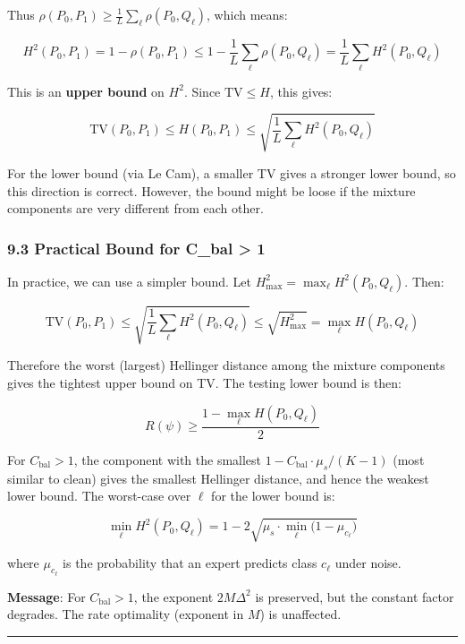 \documentclass[
  12pt,
]{article}
\begin{document}
Thus \(\rho(P_0, P_1) \geq \frac{1}{L}\sum_{\ell} \rho(P_0, Q_\ell)\),
which means:

\[H^2(P_0, P_1) = 1 - \rho(P_0, P_1) \leq 1 - \frac{1}{L}\sum_{\ell} \rho(P_0, Q_\ell)
= \frac{1}{L}\sum_{\ell} H^2(P_0, Q_\ell)\]

This is an \textbf{upper bound} on \(H^2\). Since \(\text{TV} \leq H\),
this gives:

\[\text{TV}(P_0, P_1) \leq H(P_0, P_1) \leq \sqrt{\frac{1}{L}\sum_{\ell} H^2(P_0, Q_\ell)}\]

For the lower bound (via Le Cam), a smaller TV gives a stronger lower
bound, so this direction is correct. However, the bound might be loose
if the mixture components are very different from each other.

\subsubsection{9.3 Practical Bound for C\_bal \textgreater{}
1}\label{practical-bound-for-c_bal-1}

In practice, we can use a simpler bound. Let
\(H^2_{\max} = \max_{\ell} H^2(P_0, Q_\ell)\). Then:

\[\text{TV}(P_0, P_1) \leq \sqrt{\frac{1}{L}\sum_{\ell} H^2(P_0, Q_\ell)}
\leq \sqrt{H^2_{\max}} = \max_{\ell} H(P_0, Q_\ell)\]

Therefore the worst (largest) Hellinger distance among the mixture
components gives the tightest upper bound on TV. The testing lower bound
is then:

\[R(\psi) \geq \frac{1 - \max_{\ell} H(P_0, Q_\ell)}{2}\]

For \(C_{\text{bal}} > 1\), the component with the smallest
\(1 - C_{\text{bal}}\cdot\mu_s/(K-1)\) (most similar to clean) gives the
smallest Hellinger distance, and hence the weakest lower bound. The
worst-case over \(\ell\) for the lower bound is:

\[\min_{\ell} H^2(P_0, Q_\ell) = 1 - 2\sqrt{\mu_s \cdot \min_{\ell}\bigl(1 - \mu_{c_\ell}\bigr)}\]

where \(\mu_{c_\ell}\) is the probability that an expert predicts class
\(c_\ell\) under noise.

\textbf{Message}: For \(C_{\text{bal}} > 1\), the exponent
\(2M\Delta^2\) is preserved, but the constant factor degrades. The rate
optimality (exponent in \(M\)) is unaffected.

\begin{center}\rule{0.5\linewidth}{0.5pt}\end{center}
\end{document}
